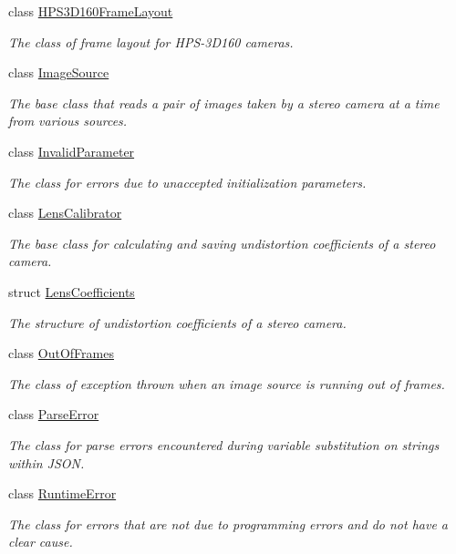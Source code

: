 \begin{DoxyCompactItemize}
class \hyperlink{classstereo__ugv_1_1HPS3D160FrameLayout}{H\+P\+S3\+D160\+Frame\+Layout}
\begin{DoxyCompactList}\small\item\em The class of frame layout for H\+P\+S-\/3\+D160 cameras. \end{DoxyCompactList}\item 
class \hyperlink{classstereo__ugv_1_1ImageSource}{Image\+Source}
\begin{DoxyCompactList}\small\item\em The base class that reads a pair of images taken by a stereo camera at a time from various sources. \end{DoxyCompactList}\item 
class \hyperlink{classstereo__ugv_1_1InvalidParameter}{Invalid\+Parameter}
\begin{DoxyCompactList}\small\item\em The class for errors due to unaccepted initialization parameters. \end{DoxyCompactList}\item 
class \hyperlink{classstereo__ugv_1_1LensCalibrator}{Lens\+Calibrator}
\begin{DoxyCompactList}\small\item\em The base class for calculating and saving undistortion coefficients of a stereo camera. \end{DoxyCompactList}\item 
struct \hyperlink{structstereo__ugv_1_1LensCoefficients}{Lens\+Coefficients}
\begin{DoxyCompactList}\small\item\em The structure of undistortion coefficients of a stereo camera. \end{DoxyCompactList}\item 
class \hyperlink{classstereo__ugv_1_1OutOfFrames}{Out\+Of\+Frames}
\begin{DoxyCompactList}\small\item\em The class of exception thrown when an image source is running out of frames. \end{DoxyCompactList}\item 
class \hyperlink{classstereo__ugv_1_1ParseError}{Parse\+Error}
\begin{DoxyCompactList}\small\item\em The class for parse errors encountered during variable substitution on strings within J\+S\+ON. \end{DoxyCompactList}\item 
class \hyperlink{classstereo__ugv_1_1RuntimeError}{Runtime\+Error}
\begin{DoxyCompactList}\small\item\em The class for errors that are not due to programming errors and do not have a clear cause. \end{DoxyCompactList}\end{DoxyCompactItemize}
